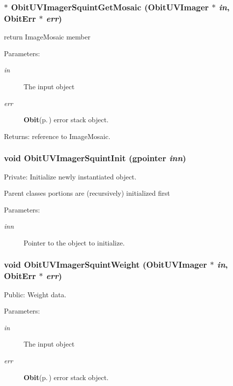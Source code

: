 \subsubsection{$\ast$ Obit\-UVImager\-Squint\-Get\-Mosaic ({\bf Obit\-UVImager} $\ast$ {\em in}, {\bf Obit\-Err} $\ast$ {\em err})}\label{ObitUVImagerSquint_8c_a15}


return Image\-Mosaic member 

\begin{Desc}
\item[Parameters:]
\begin{description}
\item[{\em in}]The input object \item[{\em err}]{\bf Obit}{\rm (p.\,\pageref{structObit})} error stack object. \end{description}
\end{Desc}
\begin{Desc}
\item[Returns:]reference to Image\-Mosaic. \end{Desc}
\subsubsection{\setlength{\rightskip}{0pt plus 5cm}void Obit\-UVImager\-Squint\-Init (gpointer {\em inn})}\label{ObitUVImagerSquint_8c_a3}


Private: Initialize newly instantiated object. 

Parent classes portions are (recursively) initialized first \begin{Desc}
\item[Parameters:]
\begin{description}
\item[{\em inn}]Pointer to the object to initialize. \end{description}
\end{Desc}
\subsubsection{\setlength{\rightskip}{0pt plus 5cm}void Obit\-UVImager\-Squint\-Weight ({\bf Obit\-UVImager} $\ast$ {\em in}, {\bf Obit\-Err} $\ast$ {\em err})}\label{ObitUVImagerSquint_8c_a13}


Public: Weight data. 

\begin{Desc}
\item[Parameters:]
\begin{description}
\item[{\em in}]The input object \item[{\em err}]{\bf Obit}{\rm (p.\,\pageref{structObit})} error stack object. \end{description}
\end{Desc}
